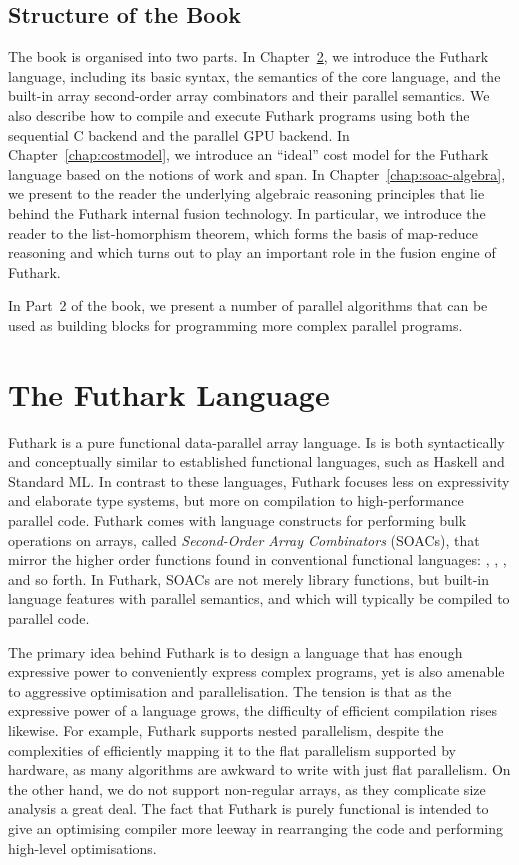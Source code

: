 \documentclass[oneside,11pt]{book}
\begin{document}
\section{Structure of the Book}

The book is organised into two parts. In Chapter~\ref{chap:futlang}, we
introduce the Futhark language, including its basic syntax, the
semantics of the core language, and the built-in array second-order
array combinators and their parallel semantics. We also describe how
to compile and execute Futhark programs using both the sequential C
backend and the parallel GPU backend. In Chapter~\ref{chap:costmodel}, we introduce
an ``ideal'' cost model for the Futhark language based on the notions
of work and span. In Chapter~\ref{chap:soac-algebra}, we present to
the reader the underlying algebraic reasoning principles that lie
behind the Futhark internal fusion technology. In particular, we
introduce the reader to the list-homorphism theorem, which forms the
basis of map-reduce reasoning and which turns out to play an important
role in the fusion engine of Futhark.

In Part~2 of the book, we present a number of parallel algorithms that
can be used as building blocks for programming more complex parallel
programs.

\chapter{The Futhark Language}
\label{chap:futlang}
Futhark is a pure functional data-parallel array language.  Is is both
syntactically and conceptually similar to established functional
languages, such as Haskell and Standard ML.  In contrast to these
languages, Futhark focuses less on expressivity and elaborate type
systems, but more on compilation to high-performance parallel code.
Futhark comes with language constructs for performing bulk operations
on arrays, called \textit{Second-Order Array Combinators} (SOACs),
that mirror the higher order functions found in conventional
functional languages: , , ,
and so forth.  In Futhark, SOACs are not merely library functions, but
built-in language features with parallel semantics, and which will
typically be compiled to parallel code.

The primary idea behind Futhark is to design a language that has
enough expressive power to conveniently express complex programs, yet
is also amenable to aggressive optimisation and parallelisation.  The
tension is that as the expressive power of a language grows, the
difficulty of efficient compilation rises likewise.  For example,
Futhark supports nested parallelism, despite the complexities of
efficiently mapping it to the flat parallelism supported by hardware,
as many algorithms are awkward to write with just flat parallelism.
On the other hand, we do not support non-regular arrays, as they
complicate size analysis a great deal.  The fact that Futhark is
purely functional is intended to give an optimising compiler more
leeway in rearranging the code and performing high-level
optimisations.
\end{document}
